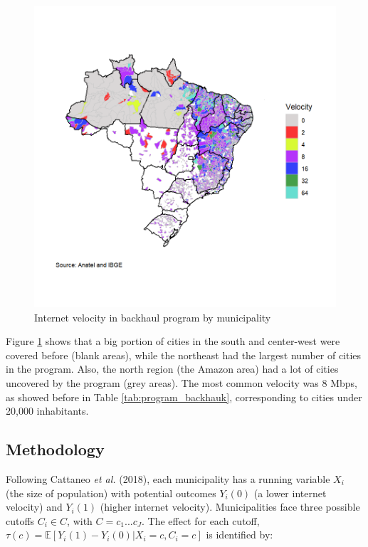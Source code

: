 \documentclass[
  12pt,
]{article}
\begin{document}
\begin{figure}
\centering
\includegraphics{artigo1_files/figure-latex/unnamed-chunk-2-1.png}
\caption{Internet velocity in backhaul program by municipality
\label{fig:1}}
\end{figure}

Figure \ref{fig:1} shows that a big portion of cities in the south and
center-west were covered before (blank areas), while the northeast had
the largest number of cities in the program. Also, the north region (the
Amazon area) had a lot of cities uncovered by the program (grey areas).
The most common velocity was 8 Mbps, as showed before in Table
\ref{tab:program_backhauk}, corresponding to cities under 20,000
inhabitants.

\hypertarget{methodology}{%
\subsection{Methodology}\label{methodology}}

Following Cattaneo \emph{et al.} (2018), each municipality has a running
variable \(X_i\) (the size of population) with potential outcomes
\(Y_i(0)\) (a lower internet velocity) and \(Y_i(1)\) (higher internet
velocity). Municipalities face three possible cutoffs \(C_i \in C\),
with \(C = {c_1 ... c_J}\). The effect for each cutoff,
\(\tau(c)= \mathbb{E}[Y_i(1)-Y_i(0)|X_i=c,C_i=c]\) is identified by:
\end{document}
